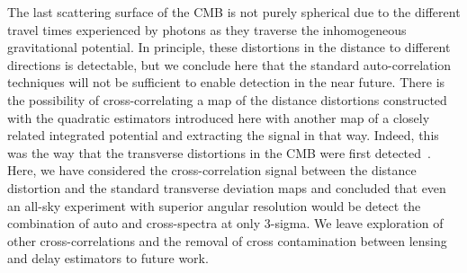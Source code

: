 \documentclass[prd,amsmath,amssymb,floatfix,superscriptaddress,nofootinbib,twocolumn]{revtex4-1}
\begin{document}
The last scattering surface of the CMB is not purely spherical due to the different travel times experienced by photons as they traverse the inhomogeneous gravitational potential. In principle, these distortions in the distance to different directions is detectable, but we conclude here that the standard auto-correlation techniques will not be sufficient to enable detection in the near future. There is the possibility of cross-correlating a map of the distance distortions constructed with the quadratic estimators introduced here with another map of a closely related integrated potential and extracting the signal in that way. Indeed, this was the way that the transverse distortions in the CMB were first detected~\cite{Smith:2007rg}. Here, we have considered  the cross-correlation signal between the distance distortion and the standard transverse deviation maps and concluded that even an all-sky experiment with superior angular resolution would be detect the combination of auto and cross-spectra at only 3-sigma. We leave exploration of other cross-correlations and the removal of cross contamination between lensing and delay estimators to future work.





\end{document}
